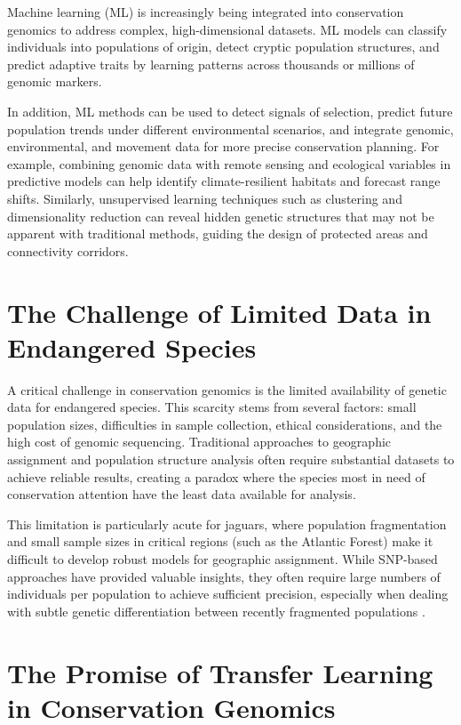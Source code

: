 Machine learning (ML) is increasingly being integrated into conservation genomics to address complex, high-dimensional datasets. ML models can classify individuals into populations of origin, detect cryptic population structures, and predict adaptive traits by learning patterns across thousands or millions of genomic markers.

In addition, ML methods can be used to detect signals of selection, predict future population trends under different environmental scenarios, and integrate genomic, environmental, and movement data for more precise conservation planning. For example, combining genomic data with remote sensing and ecological variables in predictive models can help identify climate-resilient habitats and forecast range shifts. Similarly, unsupervised learning techniques such as clustering and dimensionality reduction can reveal hidden genetic structures that may not be apparent with traditional methods, guiding the design of protected areas and connectivity corridors.

\section{The Challenge of Limited Data in Endangered Species}

A critical challenge in conservation genomics is the limited availability of genetic data for endangered species. This scarcity stems from several factors: small population sizes, difficulties in sample collection, ethical considerations, and the high cost of genomic sequencing. Traditional approaches to geographic assignment and population structure analysis often require substantial datasets to achieve reliable results, creating a paradox where the species most in need of conservation attention have the least data available for analysis.

This limitation is particularly acute for jaguars, where population fragmentation and small sample sizes in critical regions (such as the Atlantic Forest) make it difficult to develop robust models for geographic assignment. While SNP-based approaches have provided valuable insights, they often require large numbers of individuals per population to achieve sufficient precision, especially when dealing with subtle genetic differentiation between recently fragmented populations \cite{lazzari2025development, haag2010effect}.

\section{The Promise of Transfer Learning in Conservation Genomics}

